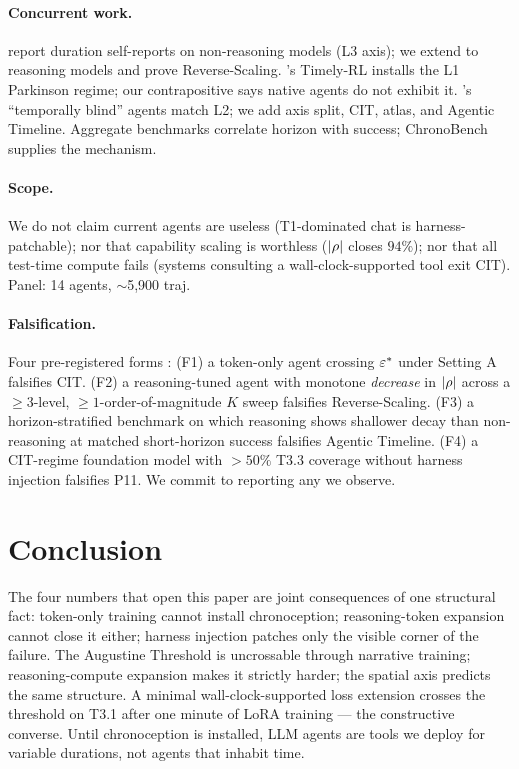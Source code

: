 \documentclass[letterpaper]{article}
\begin{document}
\paragraph{Concurrent work.} \citet{garikaparthi2026canllmstime} report duration self-reports on non-reasoning models (L3 axis); we extend to reasoning models and prove Reverse-Scaling. \citet{ma2026timelymachine}'s Timely-RL installs the L1 Parkinson regime; our contrapositive says native agents do not exhibit it. \citet{cheng2025temporallyblind}'s ``temporally blind'' agents match L2; we add axis split, CIT, atlas, and Agentic Timeline. Aggregate benchmarks \citep{swebench,webarena,gaia,kwa2025metrhorizons} correlate horizon with success; ChronoBench supplies the mechanism.

\paragraph{Scope.} We do not claim current agents are useless (T1-dominated chat is harness-patchable); nor that capability scaling is worthless ($|\rho|$ closes $94\%$); nor that all test-time compute fails (systems consulting a wall-clock-supported tool exit CIT). Panel: 14 agents, $\sim$5,900 traj.

\paragraph{Falsification.} Four pre-registered forms \citep{osf-prereg-2026}: (F1) a token-only agent crossing $\varepsilon^{*}$ under Setting A falsifies CIT. (F2) a reasoning-tuned agent with monotone \emph{decrease} in $|\rho|$ across a $\geq 3$-level, $\geq 1$-order-of-magnitude $K$ sweep falsifies Reverse-Scaling. (F3) a horizon-stratified benchmark on which reasoning shows shallower decay than non-reasoning at matched short-horizon success falsifies Agentic Timeline. (F4) a CIT-regime foundation model with $> 50\%$ T3.3 coverage without harness injection falsifies P11. We commit to reporting any we observe.

\section{Conclusion}

The four numbers that open this paper are joint consequences of one structural fact: token-only training cannot install chronoception; reasoning-token expansion cannot close it either; harness injection patches only the visible corner of the failure. The Augustine Threshold is uncrossable through narrative training; reasoning-compute expansion makes it strictly harder; the spatial axis predicts the same structure. A minimal wall-clock-supported loss extension crosses the threshold on T3.1 after one minute of LoRA training --- the constructive converse. Until chronoception is installed, LLM agents are tools we deploy for variable durations, not agents that inhabit time.



\end{document}
